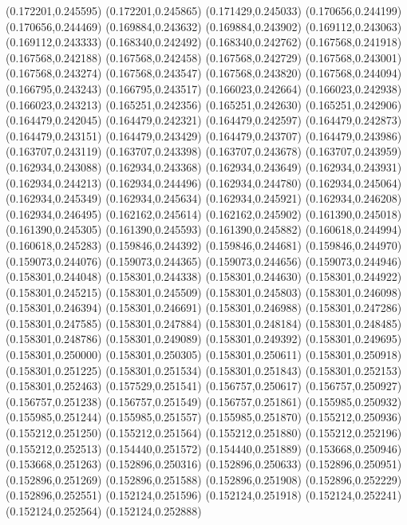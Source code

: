 (0.172201,0.245595)
(0.172201,0.245865)
(0.171429,0.245033)
(0.170656,0.244199)
(0.170656,0.244469)
(0.169884,0.243632)
(0.169884,0.243902)
(0.169112,0.243063)
(0.169112,0.243333)
(0.168340,0.242492)
(0.168340,0.242762)
(0.167568,0.241918)
(0.167568,0.242188)
(0.167568,0.242458)
(0.167568,0.242729)
(0.167568,0.243001)
(0.167568,0.243274)
(0.167568,0.243547)
(0.167568,0.243820)
(0.167568,0.244094)
(0.166795,0.243243)
(0.166795,0.243517)
(0.166023,0.242664)
(0.166023,0.242938)
(0.166023,0.243213)
(0.165251,0.242356)
(0.165251,0.242630)
(0.165251,0.242906)
(0.164479,0.242045)
(0.164479,0.242321)
(0.164479,0.242597)
(0.164479,0.242873)
(0.164479,0.243151)
(0.164479,0.243429)
(0.164479,0.243707)
(0.164479,0.243986)
(0.163707,0.243119)
(0.163707,0.243398)
(0.163707,0.243678)
(0.163707,0.243959)
(0.162934,0.243088)
(0.162934,0.243368)
(0.162934,0.243649)
(0.162934,0.243931)
(0.162934,0.244213)
(0.162934,0.244496)
(0.162934,0.244780)
(0.162934,0.245064)
(0.162934,0.245349)
(0.162934,0.245634)
(0.162934,0.245921)
(0.162934,0.246208)
(0.162934,0.246495)
(0.162162,0.245614)
(0.162162,0.245902)
(0.161390,0.245018)
(0.161390,0.245305)
(0.161390,0.245593)
(0.161390,0.245882)
(0.160618,0.244994)
(0.160618,0.245283)
(0.159846,0.244392)
(0.159846,0.244681)
(0.159846,0.244970)
(0.159073,0.244076)
(0.159073,0.244365)
(0.159073,0.244656)
(0.159073,0.244946)
(0.158301,0.244048)
(0.158301,0.244338)
(0.158301,0.244630)
(0.158301,0.244922)
(0.158301,0.245215)
(0.158301,0.245509)
(0.158301,0.245803)
(0.158301,0.246098)
(0.158301,0.246394)
(0.158301,0.246691)
(0.158301,0.246988)
(0.158301,0.247286)
(0.158301,0.247585)
(0.158301,0.247884)
(0.158301,0.248184)
(0.158301,0.248485)
(0.158301,0.248786)
(0.158301,0.249089)
(0.158301,0.249392)
(0.158301,0.249695)
(0.158301,0.250000)
(0.158301,0.250305)
(0.158301,0.250611)
(0.158301,0.250918)
(0.158301,0.251225)
(0.158301,0.251534)
(0.158301,0.251843)
(0.158301,0.252153)
(0.158301,0.252463)
(0.157529,0.251541)
(0.156757,0.250617)
(0.156757,0.250927)
(0.156757,0.251238)
(0.156757,0.251549)
(0.156757,0.251861)
(0.155985,0.250932)
(0.155985,0.251244)
(0.155985,0.251557)
(0.155985,0.251870)
(0.155212,0.250936)
(0.155212,0.251250)
(0.155212,0.251564)
(0.155212,0.251880)
(0.155212,0.252196)
(0.155212,0.252513)
(0.154440,0.251572)
(0.154440,0.251889)
(0.153668,0.250946)
(0.153668,0.251263)
(0.152896,0.250316)
(0.152896,0.250633)
(0.152896,0.250951)
(0.152896,0.251269)
(0.152896,0.251588)
(0.152896,0.251908)
(0.152896,0.252229)
(0.152896,0.252551)
(0.152124,0.251596)
(0.152124,0.251918)
(0.152124,0.252241)
(0.152124,0.252564)
(0.152124,0.252888)
